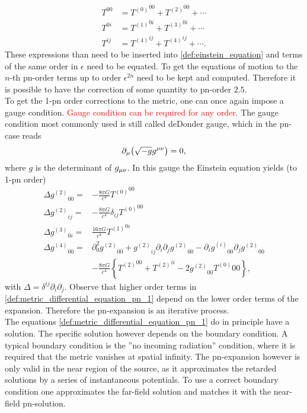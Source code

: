 \begin{align}\label{def:pn_expansion_energy_momentum_tensor}
T^{00} & = {T^{(0)}}^{00}+{T^{(2)}}^{00}+\cdots\nonumber\\
T^{0i} & = {T^{(1)}}^{0i}+{T^{(3)}}^{0i}+\cdots\\
T^{ij} & = {T^{(4)}}^{ij}+{T^{(4)}}^{ij}+\cdots.\nonumber
\end{align}
These expressions than need to be inserted into \eqref{def:einstein_equation} and terms of the same order in $\epsilon$ need to be equated. To get the equations of motion to the $n$-th \gls{pn}-order terms up to order $\epsilon^{2n}$ need to be kept and computed. Therefore it is possible to have the correction of some quantity to \gls{pn}-order $2.5$.\\
To get the 1-\gls{pn} order corrections to the metric, one can once again impose a gauge condition. \textcolor{red}{Gauge condition can be required for any order.} The gauge condition most commonly used is still called deDonder gauge, which in the \gls{pn}-case reads
\begin{equation}
\partial_\mu{\left( \sqrt{-g}g^{\mu\nu}\right)}=0,
\end{equation}
where $g$ is the determinant of $g_{\mu\nu}$. In this gauge the Einstein equation yields (to 1-\gls{pn} order)
\begin{align}\label{def:metric_differential_equation_pn_1}
\Delta {g^{(2)}}_{00} = & -\frac{8\pi G}{c^4}{T^{(0)}}^{00}\nonumber\\
\Delta {g^{(2)}}_{ij} = & -\frac{8\pi G}{c^4}\delta_{ij}{T^{(0)}}^{00}\nonumber\\
\Delta {g^{(3)}}_{0i} = & \frac{16\pi G}{c^4}{T^{(1)}}^{0i}\\
\Delta {g^{(4)}}_{00} = & \partial_0^2{g^{(2)}}_{00} + {g^{(2)}}_{ij}\partial_i\partial_j{g^{(2)}}_{00}-\partial_i{g^{(i)}}_{00}\partial_j{g^{(2)}}_{00}\nonumber\\
& -\frac{8\pi G}{c^4}\left\{{T^{(2)}}^{00}+{T^{(2)}}^{ii}-2{g^{(2)}}_{00}{T^{(0)}}{00}\right\},\nonumber
\end{align}
with $\Delta = \delta^{ij}\partial_i\partial_j$. Observe that higher order terms in \eqref{def:metric_differential_equation_pn_1} depend on the lower order terms of the expansion. Therefore the \gls{pn}-expansion is an iterative process.\\
The equations \eqref{def:metric_differential_equation_pn_1} do in principle have a solution. The specific solution however depends on the boundary condition. A typical boundary condition is the ''no incoming radiation'' condition, where it is required that the metric vanishes at spatial infinity. The \gls{pn}-expansion however is only valid in the near region of the source, as it approximates the retarded solutions by a series of instantaneous potentials. To use a correct boundary condition one approximates the far-field solution and matches it with the near-field \gls{pn}-solution.\\
